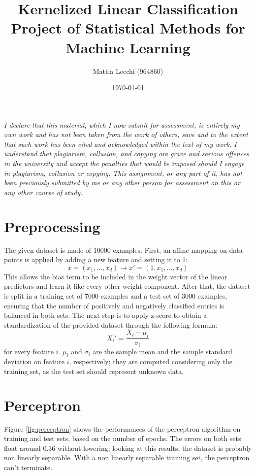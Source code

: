 \documentclass{article}
\author{Mattia Lecchi (964860)}
\date{\today}
\title{Kernelized Linear Classification \\ 
	\large Project of Statistical Methods for Machine Learning}
\begin{document}
\maketitle
\textit{I declare that this material, which I now submit for assessment, is entirely my own work and has not been taken from the work of others, save and to the extent that such work has been cited and acknowledged within the text of my work. I understand that plagiarism, collusion, and copying are grave and serious offences in the university and accept the penalties that would be imposed should I engage in plagiarism, collusion or copying. This assignment, or any part of it, has not been previously submitted by me or any other person for assessment on this or any other course of study.	}

\section{Preprocessing}
\label{sec:preprocessing}
The given dataset is made of 10000 examples. First, an affine mapping on data points is applied by adding a new feature and setting it to 1:
\begin{equation}
	x = (x_1, ..., x_d) \rightarrow x'=(1, x_1, ..., x_d)
\end{equation}
This allows the bias term to be included in the weight vector of the linear predictors and learn it like every other weight component. After that, the dataset is split in a training set of 7000 examples and a test set of 3000 examples, ensuring that the number of positively and negatively classified entries is balanced in both sets.
The next step is to apply z-score to obtain a standardization of the provided dataset through the following formula:
\begin{equation}
	X_i' = \frac{X_i - \mu_i}{\sigma_i}
\end{equation}
for every feature $i$. $\mu_i$ and $\sigma_i$ are the sample mean and the sample standard deviation on feature $i$, respectively; they are computed considering only the training set, as the test set should represent unknown data.

\section{Perceptron}

Figure \ref{fig:perceptron} shows the performances of the perceptron algorithm on training and test sets, based on the number of epochs. 
The errors on both sets float around 0.36 without lowering; looking at this results, the dataset is probably non linearly separable. With a non linearly separable training set, the perceptron can't terminate.
\end{document}
